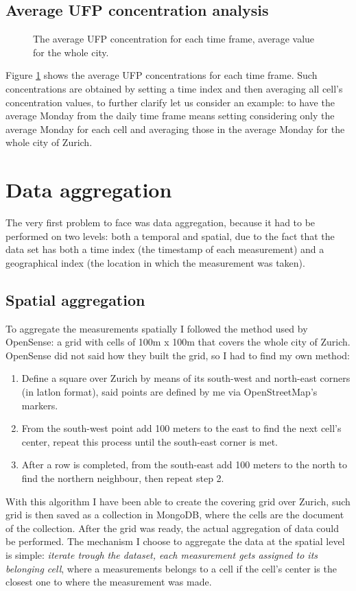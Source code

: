 \documentclass[11pt,a4paper,titlepage]{book}
\begin{document}
\subsection{Average UFP concentration analysis}
\begin{figure}[ht]
    \centering
    
    \caption{The average UFP concentration for each time frame, average value for the whole city.} 
    \label{cleanair_average_ufp_city}
\end{figure}
Figure \ref{cleanair_average_ufp_city} shows the average UFP concentrations for each time frame. Such concentrations are obtained by setting a time index and then averaging all cell's concentration values, to further clarify let us consider an example: to have the average Monday from the daily time frame means setting considering only the average Monday for each cell and averaging those in the average Monday for the whole city of Zurich.
\newpage
\section{Data aggregation}
The very first problem to face was data aggregation, because it had to be performed on two levels: both a temporal and spatial, due to the fact that the data set has both a time index (the timestamp of each measurement) and a geographical index (the location in which the measurement was taken). 
\subsection{Spatial aggregation}
To aggregate the measurements spatially I followed the method used by OpenSense: a grid with cells of 100m x 100m that covers the whole city of Zurich.
\newline
\newline
OpenSense did not said how they built the grid, so I had to find my own method: 
\begin{enumerate}
    \item Define a square over Zurich by means of its south-west and north-east corners (in latlon format), said points are defined by me via OpenStreetMap's markers.
    \item From the south-west point add 100 meters to the east to find the next cell's center, repeat this process until the south-east corner is met.
    \item After a row is completed, from the south-east add 100 meters to the north to find the northern neighbour, then repeat step 2.
\end{enumerate}
With this algorithm I have been able to create the covering grid over Zurich, such grid is then saved as a collection in MongoDB, where the cells are the document of the collection.
\newline
\newline
After the grid was ready, the actual aggregation of data could be performed. The mechanism I choose to aggregate the data at the spatial level is simple: \textit{iterate trough the dataset, each measurement gets assigned to its belonging cell}, where a measurements belongs to a cell if the cell's center is the closest one to where the measurement was made.
\end{document}
